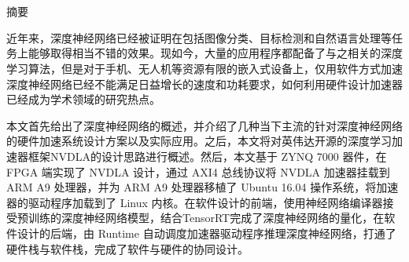 \maketitle%
\chapter[摘要]{\MyTitleCh}
\setcounter{page}{1}%

\begin{center}
\vspace{-0.3cm}
 \songti 摘要
\vspace{0.3cm}
\end{center}

近年来，深度神经网络已经被证明在包括图像分类、目标检测和自然语言处理等任务上能够取得相当不错的效果。现如今，大量的应用程序都配备了与之相关的深度学习算法，但是对于手机、无人机等资源有限的嵌入式设备上，仅用软件方式加速深度神经网络已经不能满足日益增长的速度和功耗要求，如何利用硬件设计加速器已经成为学术领域的研究热点。

本文首先给出了深度神经网络的概述，并介绍了几种当下主流的针对深度神经网络的硬件加速系统设计方案以及实际应用。之后，本文将对英伟达开源的深度学习加速器框架NVDLA的设计思路进行概述。然后，本文基于 ZYNQ 7000 器件，在 FPGA 端实现了 NVDLA 设计，通过 AXI4 总线协议将 NVDLA 加速器挂载到 ARM A9 处理器，并为 ARM A9 处理器移植了 Ubuntu 16.04 操作系统，将加速器的驱动程序加载到了 Linux 内核。在软件设计的前端，使用神经网络编译器接受预训练的深度神经网络模型，结合TensorRT完成了深度神经网络的量化，在软件设计的后端，由 Runtime 自动调度加速器驱动程序推理深度神经网络，打通了硬件栈与软件栈，完成了软件与硬件的协同设计。

{
}

